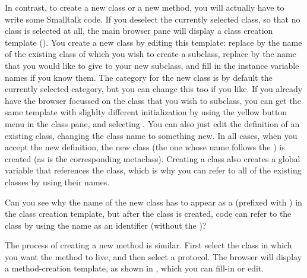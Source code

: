 \documentclass[a4paper,10pt,twoside]{book}
\begin{document}
In contrast, to create a new class or a new method, you will actually have to write some Smalltalk code.  
If you deselect the currently selected class, so that no class is selected at all, the main browser pane will display a class creation template ().
You create a new class by editing this template: replace  by the name of the existing class of which you wish to create a subclass, replace  by the name that you would like to give to your new subclass, and fill in the instance variable names if you know them. 
The category for the new class is by default the currently selected category, but you can change this too if you like.  
If you already have the browser focussed on the class that you wish to subclass, you can get the same template with slighlty different initialization by using the yellow button menu in the class pane, and selecting .
You can also just edit the definition of an existing class, changing the class name to something new.
In all cases, when you accept the new definition, the new class (the one whose name follows the \ct{#}) is created (as is the corresponding metaclass).  
Creating a class also creates a global variable that references the class, which is why you can refer to all of the existing classes by using their names.

Can you see why the name of the new class has to appear as a  (\ie prefixed with \ct{#}) in the class creation template, but after the class is created, code can refer to the class by using the name as an identifier (\ie without the \ct{#})?

The process of creating a new method is similar.  First select the class in which you want the method to live, and then select a protocol.  The browser will display a method-creation template, as shown in , which you can fill-in or edit.
\end{document}

